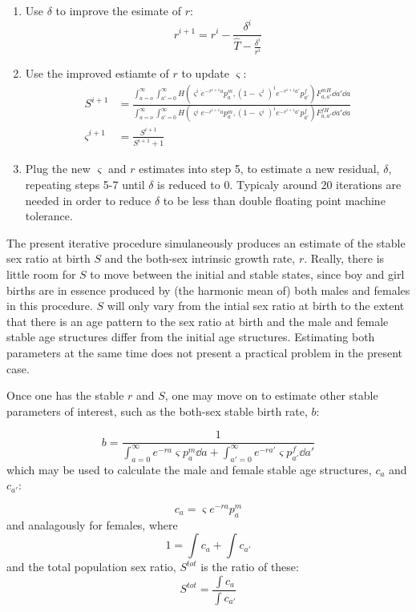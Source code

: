 \begin{enumerate}
  \item Use $\delta$ to improve the esimate of $r$:
  \begin{equation}
  r^{i+1} = r^i - \frac{\delta^i}{\widehat{T} - \frac{\delta^i}{r^i}}
  \end{equation}
  \item Use the improved estiamte of $r$ to update $\varsigma$:
  \begin{align}
  S^{i+1} &= \frac{\int_{a=o}^\infty \int_{a'=0}^\infty H(\varsigma^i
  e^{-r^{i+1}a} p_a^m, (1-\varsigma^i)^i e^{-r^{i+1}a'}p_{a'}^f) F_{a,a'}^{mH} \dd a' \dd a
  }{\int_{a=o}^\infty \int_{a'=0}^\infty H(\varsigma^i e^{-r^{i+1}a}
  p_a^m, (1-\varsigma^i)^i e^{-r^{i+1}a'}p_{a'}^f) F_{a,a'}^{fH} \dd a' \dd a }
  \\
  \varsigma^{i+1} &= \frac{S^{i+1}}{S^{i+1}+1}
  \end{align}
  \item Plug the new $\varsigma$ and $r$ estimates into step 5, to estimate a
  new residual, $\delta$, repeating steps 5-7 until $\delta$ is reduced to 0.
  Typicaly around 20 iterations are needed in order to reduce $\delta$ to
  be less than double floating point machine tolerance.
\end{enumerate}

The present iterative procedure simulaneously produces an estimate of the stable
sex ratio at birth $S$ and the both-sex intrinsic growth rate, $r$. Really,
there is little room for $S$ to move between the initial and stable states,
since boy and girl births are in essence produced by (the harmonic mean of) both
males and females in this procedure. $S$
will only vary from the intial sex ratio at birth to the extent that there is
an age pattern to the sex ratio at birth and the male and female stable age
structures differ from the initial age structures. Estimating both parameters at
the same time does not present a practical problem in the present case.

Once one has the stable $r$ and $S$, one may move on to estimate other stable
parameters of interest, such as the both-sex stable birth rate, $b$:

\begin{equation}
b = \frac{1}{\int_{a = 0}^\infty e^{-ra} \varsigma p_a^m \dd a + \int_{a' =
0}^\infty e^{-ra'} \varsigma p_{a'}^f \dd a'}
\end{equation}
which may be used to calculate the male and female stable age structures, $c_a$
and $c_{a'}$:

\begin{equation}
c_a =  \varsigma  e^{-ra} p_a^m
\end{equation}
and analagously for females, where
\begin{equation}
1 = \int c_a + \int c_{a'}
\end{equation}
and the total population sex ratio, $S^{tot}$ is the ratio of these:
\begin{equation}
S^{tot} = \frac{\int c_a}{\int c_{a'}}
\end{equation}

